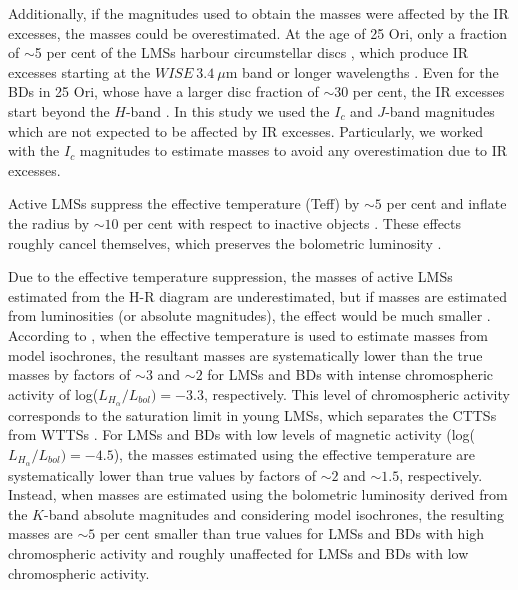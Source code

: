\documentclass[12pt]{article}
\newcounter{subsubsubsection}[subsubsection]
\begin{document}
Additionally, if the magnitudes used to obtain the masses were affected by the IR excesses, the masses could be overestimated. At the age of 25 Ori, only a fraction of $\sim$5 per cent of the LMSs harbour circumstellar discs \citep{Briceno2005,Briceno2007,Hernandez2007a,Downes2014,Briceno2018}, which produce IR excesses starting at the $WISE\ 3.4\ \mu$m band or longer wavelengths \citep{Suarez2017}. Even for the BDs in 25 Ori, whose have a larger disc fraction of $\sim 30$ per cent, the IR excesses start beyond the $H$-band \citep{Downes2015}. In this study we used the $I_c$ and $J$-band magnitudes which are not expected to be affected by IR excesses. Particularly, we worked with the $I_c$ magnitudes to estimate masses to avoid any overestimation due to IR excesses.

\label{sec_IMF:activity}

Active LMSs suppress the effective temperature (\ac{Teff}) by $\sim5$ per cent and inflate the radius by $\sim10$ per cent with respect to inactive objects \citep[e.g. ][]{Lopez-Morales2007}. These effects roughly cancel themselves, which preserves the bolometric luminosity \citep{Stassun2012}. 

Due to the effective temperature suppression, the masses of active LMSs estimated from the H-R diagram are underestimated, but if masses are estimated from luminosities (or absolute magnitudes), the effect would be much smaller \citep{Jeffries2017}. According to \citet{Stassun2012}, when the effective temperature is used to estimate masses from model isochrones, the resultant masses are systematically lower than the true masses by factors of $\sim3$ and $\sim2$ for LMSs and BDs with intense chromospheric activity of log($L_{H_\alpha}/L_{bol})=-3.3$, respectively. This level of chromospheric activity corresponds to the saturation limit in young LMSs, which separates the CTTSs from WTTSs \citep{BarradoYNavascues-Martin2003}. For LMSs and BDs with low levels of magnetic activity (log($L_{H_\alpha}/L_{bol})=-4.5$), the masses estimated using the effective temperature are systematically lower than true values by factors of $\sim2$ and $\sim1.5$, respectively. Instead, when masses are estimated using the bolometric luminosity derived from the $K$-band absolute magnitudes and considering model isochrones, the resulting masses are $\sim5$ per cent smaller than true values for LMSs and BDs with high chromospheric activity and roughly unaffected for LMSs and BDs with low chromospheric activity.
\end{document}
